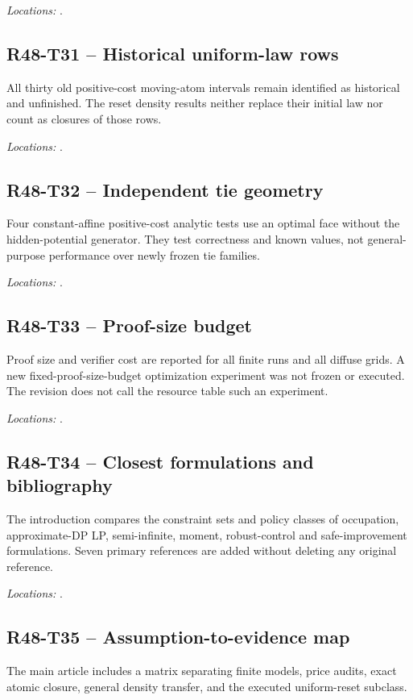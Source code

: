 \noindent\emph{Locations:} .

\subsection{R48-T31 -- Historical uniform-law rows}
All thirty old positive-cost moving-atom intervals remain identified as historical and unfinished. The reset density results neither replace their initial law nor count as closures of those rows.

\noindent\emph{Locations:} .

\subsection{R48-T32 -- Independent tie geometry}
Four constant-affine positive-cost analytic tests use an optimal face without the hidden-potential generator. They test correctness and known values, not general-purpose performance over newly frozen tie families.

\noindent\emph{Locations:} .

\subsection{R48-T33 -- Proof-size budget}
Proof size and verifier cost are reported for all finite runs and all diffuse grids. A new fixed-proof-size-budget optimization experiment was not frozen or executed. The revision does not call the resource table such an experiment.

\noindent\emph{Locations:} .

\subsection{R48-T34 -- Closest formulations and bibliography}
The introduction compares the constraint sets and policy classes of occupation, approximate-DP LP, semi-infinite, moment, robust-control and safe-improvement formulations. Seven primary references are added without deleting any original reference.

\noindent\emph{Locations:} .

\subsection{R48-T35 -- Assumption-to-evidence map}
The main article includes a matrix separating finite models, price audits, exact atomic closure, general density transfer, and the executed uniform-reset subclass.

